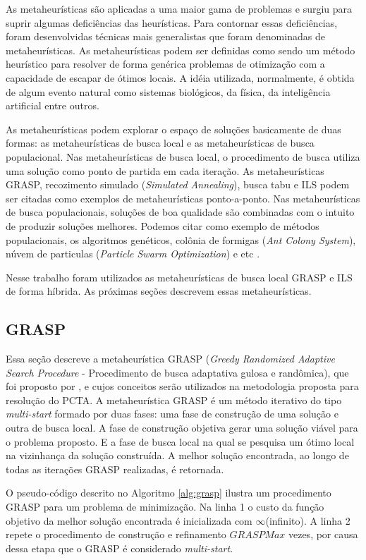 As metaheurísticas são aplicadas a uma maior gama de problemas e surgiu para
suprir algumas deficiências das heurísticas. Para contornar essas deficiências,
foram desenvolvidas técnicas mais generalistas que foram denominadas de
metaheurísticas. As metaheurísticas podem ser definidas como sendo um método
heurístico para resolver de forma genérica problemas de otimização com a
capacidade de escapar de ótimos locais. A idéia utilizada, normalmente, é
obtida de algum evento natural como sistemas biológicos, da física, da
inteligência artificial entre outros.

As metaheurísticas podem explorar o espaço de soluções basicamente de duas
formas: as metaheurísticas de busca local e as metaheurísticas de busca
populacional. Nas metaheurísticas de busca local, o procedimento de busca
utiliza uma solução como ponto de partida em cada iteração. As metaheurísticas
GRASP, recozimento simulado (\textit{Simulated Annealing}), busca tabu e ILS
podem ser citadas como exemplos de metaheurísticas ponto-a-ponto. Nas metaheurísticas de
busca populacionais, soluções de boa qualidade são combinadas com o intuito de
produzir soluções melhores. Podemos citar como exemplo de métodos
populacionais, os algoritmos genéticos, colônia de formigas (\textit{Ant Colony
System}), núvem de particulas (\textit{Particle Swarm Optimization}) e etc
\cite{maritan2009}.

Nesse trabalho foram utilizados as metaheurísticas de busca local GRASP e ILS
de forma híbrida. As próximas seções descrevem essas metaheurísticas.

\subsection{GRASP}

Essa seção descreve a metaheurística GRASP (\textit{Greedy Randomized Adaptive
Search Procedure} - Procedimento de busca adaptativa gulosa e randômica), que
foi proposto por \cite{resende1995}, e cujos conceitos serão
utilizados na metodologia proposta para resolução do PCTA. A metaheurística
GRASP é um método iterativo do tipo \textit{multi-start} formado por duas
fases: uma fase de construção de uma solução e outra de busca local. A fase de
construção objetiva gerar uma solução viável para o problema proposto. E a fase
de busca local na qual se pesquisa  um ótimo local na vizinhança da solução
construída. A melhor solução encontrada, ao longo de todas as
iterações GRASP realizadas, é retornada.

O pseudo-código descrito no Algoritmo \ref{alg:grasp} ilustra um procedimento
GRASP para um problema de minimização. Na linha 1 o custo da função objetivo da
melhor solução encontrada é inicializada com $\infty$(infinito). A linha 2
repete o procedimento de construção e refinamento $GRASPMax$ vezes, por causa dessa
etapa que o GRASP é considerado \textit{multi-start}.

